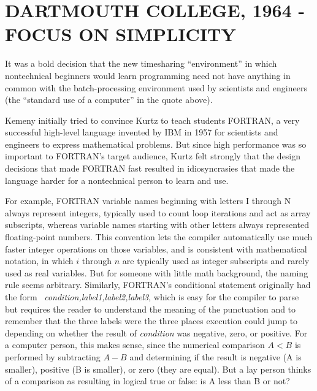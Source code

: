 
\section{DARTMOUTH COLLEGE, 1964 - FOCUS ON SIMPLICITY}




It was a bold decision that the new timesharing
``environment'' in which nontechnical beginners would learn programming need not have
anything in common with the batch-processing environment used by
scientists and engineers (the ``standard use of a computer'' in the
quote above). 

Kemeny initially tried to convince Kurtz to teach students FORTRAN, 
a very successful high-level language invented by IBM in 1957 for scientists and
engineers to express mathematical problems.  
But since high performance was so important to FORTRAN's target audience,
Kurtz felt strongly that the design decisions that made
FORTRAN fast resulted in idiosyncrasies that made the language harder
for a nontechnical person to learn and use.

\begin{tangent}
For example, FORTRAN variable names beginning with letters I
through N 
always represent integers, typically used to count loop iterations and
act as array subscripts, 
whereas variable names starting with other letters always represented
floating-point numbers.
This convention lets the compiler automatically use much faster
integer operations on those variables,
and is consistent with mathematical notation, in which
$i$ through $n$ are typically used as integer subscripts and rarely used
as real variables.
But for someone with little math background, the naming rule seems arbitrary.
Similarly, FORTRAN's conditional statement originally had the form
~\emph{condition,label1,label2,label3}, which is easy for the
compiler to parse but requires the reader to understand the meaning of
the punctuation and to remember that the three labels were the three
places execution could jump to depending on whether the result of
\emph{condition} was negative, zero, or positive.  For a computer
person, this makes sense, since the numerical comparison $A<B$ is performed 
by subtracting $A-B$ and determining if the result is negative (A is
smaller), positive (B is smaller), or zero (they are equal).
But a lay person thinks of a comparison as resulting in logical true or
false: is A less than B or not?
\end{tangent}

